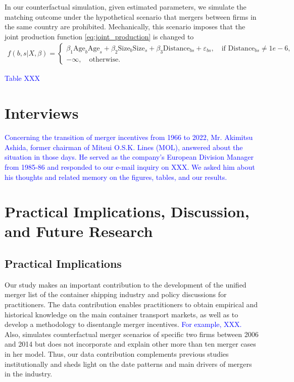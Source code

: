 \documentclass[10pt]{article}
\begin{document}
In our counterfactual simulation, given estimated parameters, we simulate the matching outcome under the hypothetical scenario that mergers between firms in the same country are prohibited. 
Mechanically, this scenario imposes that 
the joint production function \eqref{eq:joint_production} is changed to
\begin{align*}
    f(b,s|X,\beta)= \begin{cases}
        \beta_1 \text{Age}_{b}\text{Age}_{s} + \beta_2 \text{Size}_{b}\text{Size}_{s} + \beta_3 \text{Distance}_{bs} + \varepsilon_{bs}, \quad \text{if }\text{Distance}_{bs}\neq 1e-6,\\
        -\infty, \quad \text{otherwise}.
    \end{cases}
\end{align*}

\textcolor{blue}{Table XXX}

\section{Interviews}\label{sec:interviews}

\textcolor{blue}{Concerning the transition of merger incentives from 1966 to 2022, Mr.
Akimitsu Ashida, former chairman of Mitsui O.S.K. Lines (MOL), answered about the situation in those days. He served as the company’s European Division Manager from 1985-86 and responded
to our e-mail inquiry on XXX. We asked him about his thoughts and related memory on the figures, tables, and our results.}



\section{Practical Implications, Discussion, and Future Research}\label{sec:practical_implications}

\subsection{Practical Implications}

Our study makes an important contribution to the development of the unified merger list of the container shipping industry and policy discussions for practitioners. 
The data contribution enables practitioners to obtain empirical and historical knowledge on the main container transport markets, as well as to develop a methodology to disentangle merger incentives.
\textcolor{blue}{For example, XXX.} Also, \cite{jeon2022learning} simulates counterfactual merger scenarios of specific two firms between 2006 and 2014 but does not incorporate and explain other more than ten merger cases in her model.
Thus, our data contribution complements previous studies institutionally and sheds light on the date patterns and main drivers of mergers in the industry.
\end{document}
